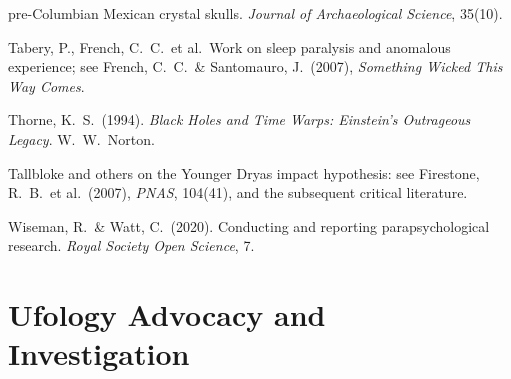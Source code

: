 \begin{list}{}{\setlength{\leftmargin}{1.2em}\setlength{\itemindent}{-1.2em}
\setlength{\itemsep}{3pt}}
pre-Columbian Mexican crystal skulls. \emph{Journal of Archaeological Science}, 35(10).
\item Tabery, P., French, C.\ C.\ et al.\ Work on sleep paralysis and anomalous experience;
see French, C.\ C.\ \& Santomauro, J.\ (2007), \emph{Something Wicked This Way Comes}.
\item Thorne, K.\ S.\ (1994). \emph{Black Holes and Time Warps: Einstein's Outrageous Legacy}.
W.\ W.\ Norton.
\item Tallbloke and others on the Younger Dryas impact hypothesis: see Firestone, R.\ B.\ et al.\
(2007), \emph{PNAS}, 104(41), and the subsequent critical literature.
\item Wiseman, R.\ \& Watt, C.\ (2020). Conducting and reporting parapsychological research.
\emph{Royal Society Open Science}, 7.
\end{list}

\section*{Ufology \mdash{} Advocacy and Investigation}

